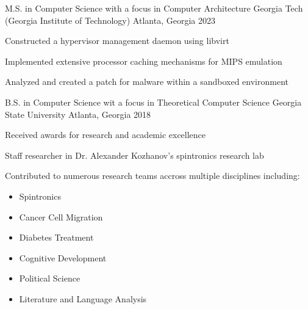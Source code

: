 


\begin{cventries}


\cventry
{M.S. in Computer Science with a focus in Computer Architecture} %
{Georgia Tech (Georgia Institute of Technology)} %
{Atlanta, Georgia} %
{2023} %
{ %
\begin{cvitems}
\item {Constructed a hypervisor management daemon using libvirt}
\item {Implemented extensive processor caching mechanisms for MIPS emulation}
\item {Analyzed and created a patch for malware within a sandboxed environment}
\end{cvitems}
}

\cventry
{B.S. in Computer Science wit a focus in Theoretical Computer Science} %
{Georgia State University} %
{Atlanta, Georgia} %
{2018} %
{ %
\begin{cvitems}
\item{Received awards for research and academic excellence}
\item{Staff researcher in Dr. Alexander Kozhanov's spintronics research lab}
\item{Contributed to numerous research teams accross multiple disciplines including:}
\begin{itemize}
\item{Spintronics}
\item{Cancer Cell Migration}
\item{Diabetes Treatment}
\item{Cognitive Development}
\item{Political Science}
\item{Literature and Language Analysis}
\end{itemize}
\end{cvitems}
}


\end{cventries}
